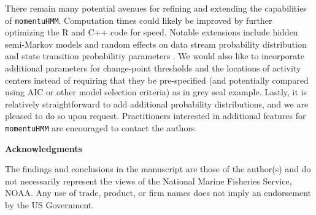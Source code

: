 \documentclass[12pt]{article}\usepackage[]{graphicx}\usepackage[]{color}
\begin{document}
There remain many potential avenues for refining and extending the capabilities of \verb|momentuHMM|. Computation times could likely be improved by further optimizing the R and C++ code for speed. Notable extensions include hidden semi-Markov models and random effects on data stream probability distribution and state transition probabilitiy parameters \citep{ZucchiniEtAl2016}. We would also like to incorporate additional parameters for change-point thresholds and the locations of activity centers instead of requiring that they be pre-specified (and potentially compared using AIC or other model selection criteria) as in grey seal example. Lastly, it is relatively straightforward to add additional probability distributions, and we are pleased to do so upon request. Practitioners interested in additional features for \verb|momentuHMM| are encouraged to contact the authors.

\noindent \textbf{Acknowledgments} 

\noindent The findings and conclusions in the manuscript are those of the author(s) and do not necessarily represent the views of the National Marine Fisheries Service, NOAA. Any use of trade, product, or firm names does not imply an endorsement by the US Government.




\clearpage
\end{document}
